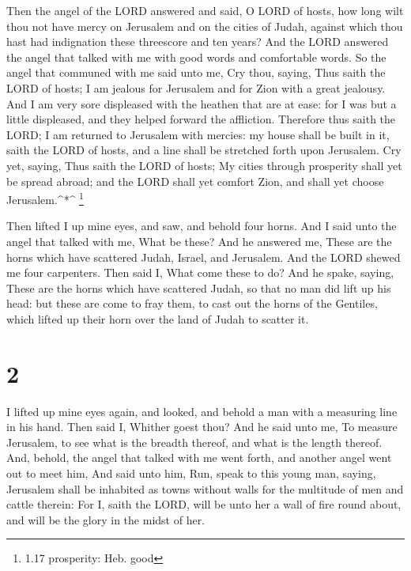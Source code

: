  Then the angel of the LORD answered and said, O LORD of
hosts, how long wilt thou not have mercy on Jerusalem and on the cities
of Judah, against which thou hast had indignation these threescore and
ten years?  And the LORD answered the angel that talked
with me with good words and comfortable words.  So the
angel that communed with me said unto me, Cry thou, saying, Thus saith
the LORD of hosts; I am jealous for Jerusalem and for Zion with a great
jealousy.  And I am very sore displeased with the heathen
that are at ease: for I was but a little displeased, and they helped
forward the affliction.  Therefore thus saith the LORD; I
am returned to Jerusalem with mercies: my house shall be built in it,
saith the LORD of hosts, and a line shall be stretched forth upon
Jerusalem.  Cry yet, saying, Thus saith the LORD of hosts;
My cities through prosperity shall yet be spread abroad; and the LORD
shall yet comfort Zion, and shall yet choose Jerusalem.\^{}*\^{}
\footnote{1.17 prosperity: Heb. good}

 Then lifted I up mine eyes, and saw, and behold four
horns.  And I said unto the angel that talked with me, What
be these? And he answered me, These are the horns which have scattered
Judah, Israel, and Jerusalem.  And the LORD shewed me four
carpenters.  Then said I, What come these to do? And he
spake, saying, These are the horns which have scattered Judah, so that
no man did lift up his head: but these are come to fray them, to cast
out the horns of the Gentiles, which lifted up their horn over the land
of Judah to scatter it.

\hypertarget{section-1}{%
\section{2}\label{section-1}}

 I lifted up mine eyes again, and looked, and behold a man
with a measuring line in his hand.  Then said I, Whither
goest thou? And he said unto me, To measure Jerusalem, to see what is
the breadth thereof, and what is the length thereof.  And,
behold, the angel that talked with me went forth, and another angel went
out to meet him,  And said unto him, Run, speak to this
young man, saying, Jerusalem shall be inhabited as towns without walls
for the multitude of men and cattle therein:  For I, saith
the LORD, will be unto her a wall of fire round about, and will be the
glory in the midst of her.

